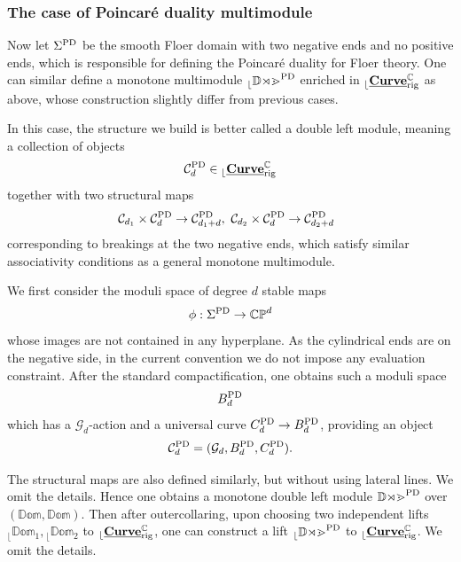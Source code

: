 \documentclass[reqno, 10pt]{amsart}
\numberwithin{equation}{section}
\numberwithin{equation}{section}
\theoremstyle{definition}
\theoremstyle{remark}
\newcommand{\beqn}{\begin{equation*}}
\newcommand{\eeqn}{\end{equation*}}
\newcommand{\mb}{\mathbb}
\newcommand{\mc}{\mathcal}
\renewcommand{\outer}{{}_{\lfloor}}
\newcommand{\uds}[1]{\underline{\smash{#1}}}
\begin{document}
\subsubsection{The case of Poincar\'e duality multimodule}

Now let $\Sigma^{\rm PD}$ be the smooth Floer domain with two negative ends and no positive ends, which is responsible for defining the Poincar\'e duality for Floer theory. One can similar define a monotone multimodule $\outer \mb{Dom}^{\rm PD}$ enriched in $\outer \uds{\bf Curve}_{\rm rig}^{\mb C}$ as above, whose construction slightly differ from previous cases. 

In this case, the structure we build is better called a double left module, meaning a collection of objects
\beqn
{\mc C}_d^{\rm PD} \in \outer \uds{\bf Curve}_{\rm rig}^{\mb C}
\eeqn
together with two structural maps
\begin{align*}
&\ {\mc C}_{d_1} \times {\mc C}_{d}^{\rm PD} \to {\mc C}_{d_1 + d}^{\rm PD},\ {\mc C}_{d_2} \times {\mc C}_d^{\rm PD} \to {\mc C}_{d_2 + d}^{\rm PD}
\end{align*}
corresponding to breakings at the two negative ends, which satisfy similar associativity conditions as a general monotone multimodule.

We first consider the moduli space of degree $d$ stable maps
\beqn
\phi: \Sigma^{\rm PD} \to \mb{CP}^d
\eeqn
whose images are not contained in any hyperplane. As the cylindrical ends are on the negative side, in the current convention we do not impose any evaluation constraint. After the standard compactification, one obtains such a moduli space
\beqn
B_d^{\rm PD}
\eeqn
which has a ${\mc G}_d$-action and a universal curve $C_d^{\rm PD} \to B_d^{\rm PD}$, providing an object
\beqn
{\mc C}_d^{\rm PD} = ({\mc G}_d, B_d^{\rm PD}, C_d^{\rm PD}).
\eeqn


The structural maps are also defined similarly, but without using lateral lines. We omit the details. Hence one obtains a monotone double left module $\mb{Dom}^{\rm PD}$ over $(\mb{Dom}, \mb{Dom})$. Then after outercollaring, upon choosing two independent lifts $\outer \mb{Dom}_1, \outer \mb{Dom}_2$ to $\outer \uds{\bf Curve}_{\rm rig}^{\mb{C}}$, one can construct a lift $\outer \mb{Dom}^{\rm PD}$ to $\outer \uds{\bf Curve}_{\rm rig}^{\mb{C}}$. We omit the details.
\end{document}
